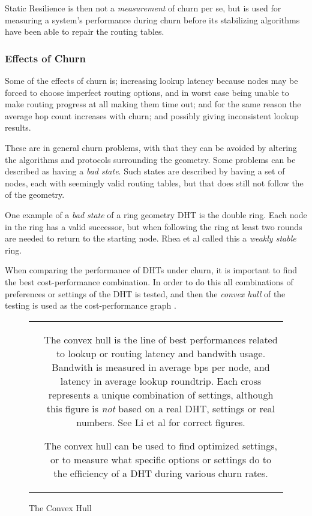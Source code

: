 Static Resilience is then not a \emph{measurement} of churn per se, but is used for
 measuring a system's performance during churn before its stabilizing algorithms have
 been able to repair the routing tables.

\subsubsection{Effects of Churn}

Some of the effects of churn is;
 increasing lookup latency because nodes may be forced to choose imperfect routing
 options\cite{li-04-comparing-performance},
 and in worst case being unable to make routing progress at all making them time out;
 and for the same reason the average hop count increases with churn;
 and possibly giving inconsistent lookup results\cite{rhea-04-handling-churn}.

These are in general  churn problems, with that they can be avoided by
 altering the algorithms and protocols surrounding the geometry. Some 
 problems can be described as having a \emph{bad state}. Such states are
 described by having a set of nodes, each with seemingly valid routing tables, but that
 does still not follow the  of the geometry.

One example of a \emph{bad state} of a ring geometry DHT is the double
 ring\cite{rhea-04-handling-churn}. Each node in the ring has a valid successor, but
 when following the ring at least two rounds are needed to return to the starting node.
 Rhea et al called this a \emph{weakly stable} ring.

When comparing the performance of DHTs under churn, it is important to find the best
 cost-performance combination. In order to do this all combinations of preferences or
 settings of the DHT is tested, and then the \emph{convex hull} of the testing is used
 as the cost-performance graph \cite{li-04-comparing-performance}.

\begin{figure}[htp]
\centering
\begin{tabular}{cc}
\parbox{.4\linewidth}{
  }
&
\parbox{.47\linewidth}{\small
  The convex hull is the line of best performances related to lookup or routing
   latency and bandwith usage. Bandwith is measured in average bps per node, and
   latency in average lookup roundtrip. Each cross represents a unique combination
   of settings, although this figure is \emph{not} based on a real DHT, settings
   or real numbers. See Li et al\cite{li-04-comparing-performance} for correct figures.

  The convex hull can be used to find optimized settings, or to measure what specific
   options or settings do to the efficiency of a DHT during various churn rates.
}
\end{tabular}
\caption{The Convex Hull}\label{fig:Convex-Hull}
\end{figure}

